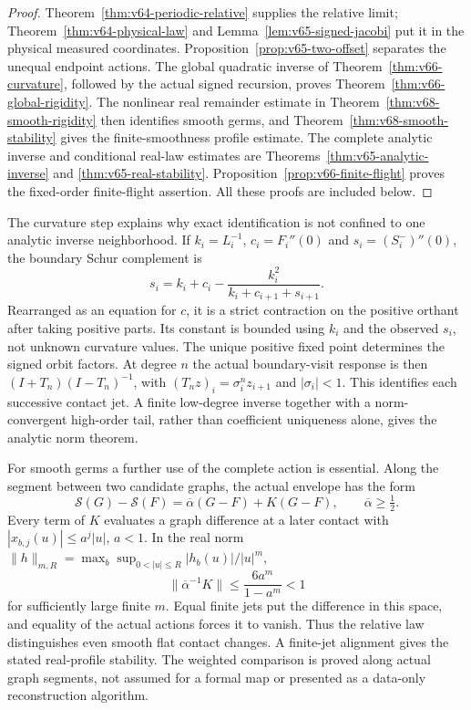 \begin{proof}
Theorem~\ref{thm:v64-periodic-relative} supplies the relative limit;
Theorem~\ref{thm:v64-physical-law} and
Lemma~\ref{lem:v65-signed-jacobi} put it in the physical measured
coordinates.  Proposition~\ref{prop:v65-two-offset} separates the
unequal endpoint actions.  The global quadratic inverse of
Theorem~\ref{thm:v66-curvature}, followed by the actual signed recursion,
proves Theorem~\ref{thm:v66-global-rigidity}.  The nonlinear real
remainder estimate in Theorem~\ref{thm:v68-smooth-rigidity} then
identifies smooth germs, and Theorem~\ref{thm:v68-smooth-stability}
gives the finite-smoothness profile estimate.  The complete analytic
inverse and conditional real-law estimates are
Theorems~\ref{thm:v65-analytic-inverse} and
\ref{thm:v65-real-stability}.  Proposition~\ref{prop:v66-finite-flight}
proves the fixed-order finite-flight assertion.  All these proofs are
included below.
\end{proof}

The curvature step explains why exact identification is not confined to
one analytic inverse neighborhood.  If $k_i=L_i^{-1}$,
$c_i=F_i''(0)$ and $s_i=(S_i^-)''(0)$, the boundary Schur complement is
\[
 s_i=k_i+c_i-\frac{k_i^2}{k_i+c_{i+1}+s_{i+1}}.
\]
Rearranged as an equation for $c$, it is a strict contraction on the
positive orthant after taking positive parts.  Its constant is bounded
using $k_i$ and the observed $s_i$, not unknown curvature values.
The unique positive fixed point determines the signed orbit factors.
At degree $n$ the actual boundary-visit response is then
$(I+T_n)(I-T_n)^{-1}$, with
$(T_n z)_i=\sigma_i^n z_{i+1}$ and $|\sigma_i|<1$.
This identifies each successive contact jet.  A finite low-degree
inverse together with a norm-convergent high-order tail, rather than
coefficient uniqueness alone, gives the analytic norm theorem.

For smooth germs a further use of the complete action is essential.
Along the segment between two candidate graphs, the actual envelope has
the form
\[
 \mathcal S(G)-\mathcal S(F)=\overline\alpha(G-F)+K(G-F),
 \qquad \overline\alpha\ge\tfrac12.
\]
Every term of $K$ evaluates a graph difference at a later contact with
$|x_{b,j}(u)|\le a^j|u|$, $a<1$.  In the real norm
$\|h\|_{m,R}=\max_b\sup_{0<|u|\le R}|h_b(u)|/|u|^m$,
\[
 \|\overline\alpha^{-1}K\|\le\frac{6a^m}{1-a^m}<1
\]
for sufficiently large finite $m$.  Equal finite jets put the difference
in this space, and equality of the actual actions forces it to vanish.
Thus the relative law distinguishes even smooth flat contact changes.
A finite-jet alignment gives the stated real-profile stability.  The
weighted comparison is proved along actual graph segments, not assumed
for a formal map or presented as a data-only reconstruction algorithm.

